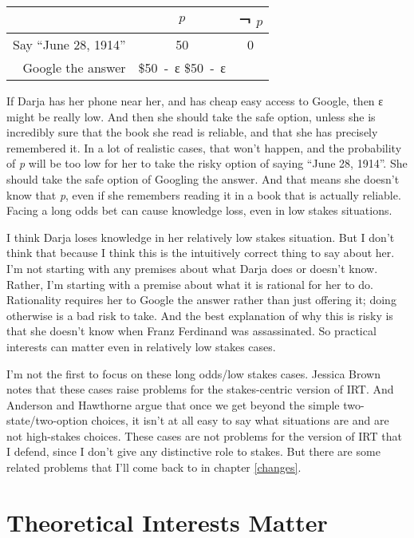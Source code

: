 \documentclass[
  11pt,
]{book}
\begin{document}
\begin{longtable}[]{@{}rcc@{}}
\toprule()
~ & \(p\) & ￢ \(p\) \\
\midrule()
\endhead
Say ``June 28, 1914'' & 50 & 0 \\
Google the answer & \$50~‑~ε \$50~‑~ε & \\
\bottomrule()
\end{longtable}

If Darja has her phone near her, and has cheap easy access to Google, then ε might be really low. And then she should take the safe option, unless she is incredibly sure that the book she read is reliable, and that she has precisely remembered it. In a lot of realistic cases, that won't happen, and the probability of \emph{p} will be too low for her to take the risky option of saying ``June 28, 1914''. She should take the safe option of Googling the answer. And that means she doesn't know that \emph{p}, even if she remembers reading it in a book that is actually reliable. Facing a long odds bet can cause knowledge loss, even in low stakes situations.

I think Darja loses knowledge in her relatively low stakes situation. But I don't think that because I think this is the intuitively correct thing to say about her. I'm not starting with any premises about what Darja does or doesn't know. Rather, I'm starting with a premise about what it is rational for her to do. Rationality requires her to Google the answer rather than just offering it; doing otherwise is a bad risk to take. And the best explanation of why this is risky is that she doesn't know when Franz Ferdinand was assassinated. So practical interests can matter even in relatively low stakes cases.

I'm not the first to focus on these long odds/low stakes cases. Jessica Brown \citeyearpar[176]{Brown2008} notes that these cases raise problems for the stakes-centric version of IRT. And Anderson and Hawthorne \citeyearpar{AndersonHawthorne2019a} argue that once we get beyond the simple two-state/two-option choices, it isn't at all easy to say what situations are and are not high-stakes choices. These cases are not problems for the version of IRT that I defend, since I don't give any distinctive role to stakes. But there are some related problems that I'll come back to in chapter \ref{changes}.

\hypertarget{whatinterests}{%
\section{Theoretical Interests Matter}\label{whatinterests}}
\end{document}
